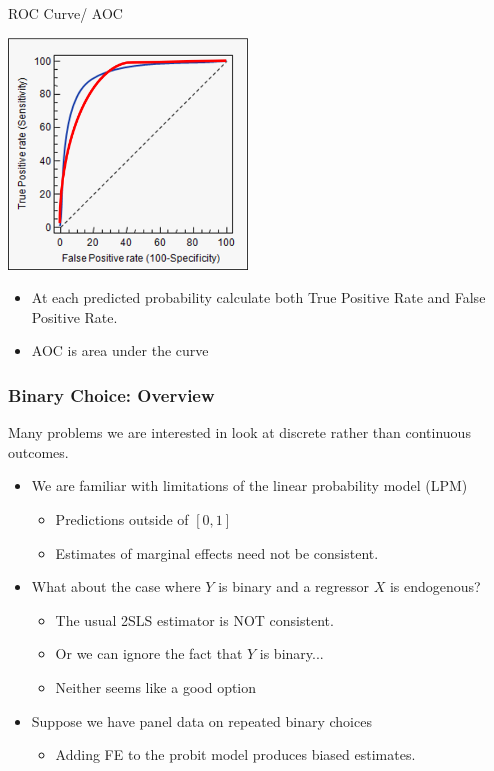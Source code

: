 \documentclass[aspectratio=169]{beamer}
\begin{document}
\begin{frame}{ROC Curve/ AOC}
\begin{center}
\includegraphics[width=2.5in]{resources/roc_curve.png}\\
\end{center}
\begin{itemize}
\item At each predicted probability calculate both \alert{True Positive Rate} and \alert{False Positive Rate}.
\item AOC is area under the curve
\end{itemize}
\end{frame}




\begin{frame}
\frametitle{Binary Choice: Overview}
Many problems we are interested in look at discrete rather than continuous outcomes.
\begin{itemize}
\item We are familiar with limitations of the linear probability model (LPM)
\begin{itemize}
\item Predictions outside of $[0,1]$
\item Estimates of marginal effects need not be consistent.
\end{itemize}
\item What about the case where $Y$ is binary and a regressor $X$ is endogenous?
\begin{itemize}
\item The usual 2SLS estimator is \alert{NOT consistent}.
\item Or we can ignore the fact that $Y$ is binary...
\item Neither seems like a good option
\end{itemize}
\item Suppose we have panel data on repeated binary choices
\begin{itemize}
\item Adding FE to the probit model produces biased estimates.
\end{itemize}
\end{itemize}
\end{frame}
\end{document}
